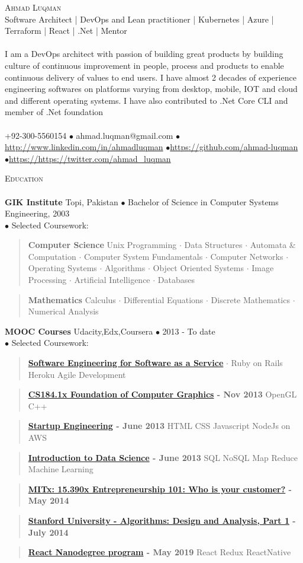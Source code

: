\documentclass{article}
\newcommand{\area}[2]{\vspace*{-9pt} \begin{verse}\textbf{#1}   #2 \end{verse}  }
\newcommand{\lineunder}{\vspace*{-8pt} \\ \hspace*{-18pt} \hrulefill \\}
\newcommand{\header}[1]{{\hspace*{-15pt}\vspace*{6pt} \textsc{#1}} \vspace*{-6pt} \lineunder}
\newcommand{\contact}[4]{
\vspace*{-8pt}
\begin{center}
{\LARGE \scshape {#1}}\\
#2 \lineunder 
#3 \lineunder
#4
\end{center}
\vspace*{-8pt}
}
\newcommand{\schoolwithcourses}[4]{
 \textbf{#1} #2 $\bullet$ #3\\ 
#4 $\bullet$  Selected Coursework:\\
\vspace*{5pt}
}
\begin{document}
\small
\smallskip
\vspace*{-44pt}

\contact{Ahmad Luqman}
{Software Architect | DevOps and Lean practitioner | Kubernetes | Azure | Terraform | React | .Net | Mentor}
{I am a DevOps architect with passion of building great products by building culture of continuous improvement in people, process and products to enable continuous delivery of values to end users. I have almost 2 decades of experience engineering softwares on platforms varying from desktop, mobile, IOT and cloud and different operating systems. I have also contributed to .Net Core CLI and member of .Net foundation}
{+92-300-5560154 $\bullet$ ahmad.luqman@gmail.com  $\bullet$\url{http://www.linkedin.com/in/ahmadluqman} $\bullet$\url{https://github.com/ahmad-luqman} $\bullet$\url{https://https://twitter.com/ahmad_luqman}}

\header{Education}

\schoolwithcourses{GIK Institute}{Topi, Pakistan}{Bachelor of Science in Computer Systems Engineering, 2003}
{}
	\area{Computer Science}{ Unix Programming $\cdot$ Data Structures $\cdot$ Automata \& Computation $\cdot$ Computer System Fundamentals $\cdot$ Computer Networks $\cdot$ Operating Systems $\cdot$
 Algorithms $\cdot$ Object Oriented Systems $\cdot$ Image Processing $\cdot$
Artificial Intelligence $\cdot$ Databases}
	\area{Mathematics}{Calculus $\cdot$ Differential Equations $\cdot$ Discrete Mathematics $\cdot$ Numerical Analysis}
\schoolwithcourses{MOOC Courses}{Udacity,Edx,Coursera}{2013 - To date}
{}
	\area{\href{https://www.class-central.com/mooc/305/coursera-software-as-a-service}{Software Engineering for Software as a Service}}{ $\cdot$ Ruby on Rails Heroku Agile Development}
	\area{\href{https://www.edx.org/course/uc-berkeleyx/uc-berkeleyx-cs-184-1x-foundations-1003}{CS184.1x Foundation of Computer Graphics} - Nov 2013}{ OpenGL C++}
	\area{\href{https://www.coursera.org/course/startup}{Startup Engineering} - June 2013}{ HTML CSS Javascript NodeJs on AWS}
	\area{\href{https://www.coursera.org/course/datasci}{Introduction to Data Science} - June 2013}{SQL NoSQL Map Reduce Machine Learning}
	\area{\href{https://class.coursera.org/hetero-002}{MITx: 15.390x Entrepreneurship 101: Who is your customer?} - May 2014}{}
	\area{\href{https://www.class-central.com/course/coursera-algorithms-design-and-analysis-part-1-374}{Stanford University - Algorithms: Design and Analysis, Part 1} - July 2014}{}
	\area{\href{https://www.udacity.com/course/react-nanodegree--nd019}{React Nanodegree program} - May 2019}{ React Redux ReactNative}
\end{document}
